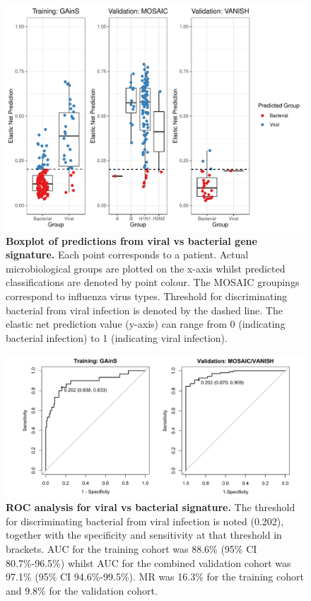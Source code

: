 \FloatBarrier
\begin{figure}[htbp]
\centering
\includegraphics[width=\textwidth]{./Results3/Images/boxplot-viral-signature.pdf}
\caption[Boxplot of viral vs bacterial signature]{\textbf{Boxplot of predictions from viral vs bacterial gene signature.} Each point corresponds to a patient. Actual microbiological groups are plotted on the x-axis whilst predicted classifications are denoted by point colour. The MOSAIC groupings correspond to influenza virus types. Threshold for discriminating bacterial from viral infection is denoted by the dashed line. The elastic net prediction value (y-axis) can range from 0 (indicating bacterial infection) to 1 (indicating viral infection).}
\label{fig:boxplot-vb}
\end{figure}
\FloatBarrier


\FloatBarrier
\begin{figure}[htbp]
\centering
\includegraphics[width=\textwidth]{./Results3/Images/bv-roc-combined.png}
\caption[ROC analysis for viral vs bacterial signature]{\textbf{ROC analysis for viral vs bacterial signature.} The threshold for discriminating bacterial from viral infection is noted (0.202), together with the specificity and sensitivity at that threshold in brackets. AUC for the training cohort was 88.6\% (95\% CI 80.7\%-96.5\%) whilst AUC for the combined validation cohort was 97.1\% (95\% CI 94.6\%-99.5\%). MR was 16.3\% for the training cohort and 9.8\% for the validation cohort.}
\label{fig:roc-vb}
\end{figure}
\FloatBarrier

